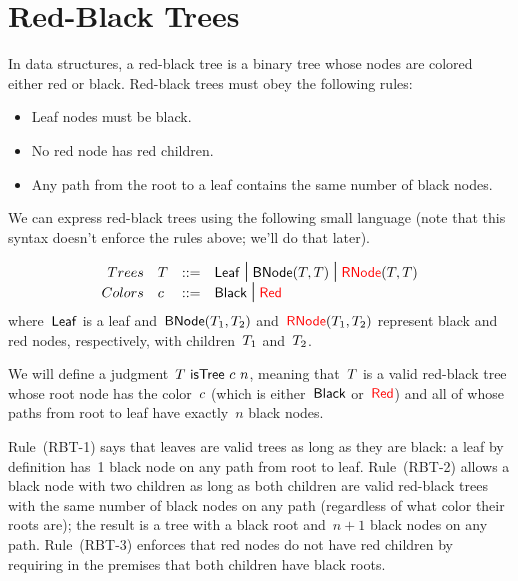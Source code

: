 \documentclass{article}
\begin{document}
\section{Red-Black Trees}
In data structures, a red-black tree is a binary tree whose nodes are colored
either red or black.
%
Red-black trees must obey the following rules:
\begin{itemize}
\item Leaf nodes must be black.
\item No red node has red children.
\item Any path from the root to a leaf contains the same number of black nodes.
\end{itemize}

We can express red-black trees using the following small language
(note that this syntax doesn't enforce the rules above; we'll do that later).

\[
\begin{array}{r l l l}
  Trees & T & \mathop{::=} & \mathsf{Leaf} \mbox{\Large $\,\mid\,$} \mathsf{BNode}(T, T) \mbox{\Large $\,\mid\,$}
  {\color{red}{\mathsf{RNode}}}(T, T)\\
  Colors & c & \mathop{::=} & \mathsf{Black} \mbox{\Large $\,\mid\,$} {\color{red}{\mathsf{Red}}}\\
\end{array}
\]
where~$\mathsf{Leaf}$ is a leaf and~$\mathsf{BNode}(T_1, T_2)$
and~${\color{red}{\mathsf{RNode}}}(T_1, T_2)$ represent black and red nodes, respectively,
with children~$T_1$ and~$T_2$.

We will define a judgment~$T~\mathsf{isTree}~c~n$, meaning that~$T$ is
a valid red-black tree whose root node has the color~$c$ (which is
either~$\mathsf{Black}$ or~${\color{red}{\mathsf{Red}}}$) and all of whose paths from root to leaf have
exactly~$n$ black nodes.

{
  \centering
  \def \MathparLineskip {\lineskip=0.43cm}
}

Rule~(RBT-1) says that leaves are valid trees as long as they are
black: a leaf by definition has~1 black node on any path from root to leaf.
%
Rule~(RBT-2) allows a black node with two children as long as both
children are valid red-black trees with the same number of black nodes on any
path (regardless of what color their roots are); the result is a tree with a
black root and~$n+1$ black nodes on any path.
%
Rule~(RBT-3) enforces that red nodes do not have red children by
requiring in the premises that both children have black roots.
\end{document}
